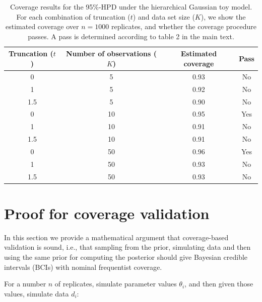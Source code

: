 \documentclass[oneside]{article}
\begin{document}
\begin{table}[!h]
\caption{Coverage results for the 95\%-HPD under the hierarchical Gaussian toy model.
For each combination of truncation ($t$) and data set size ($K$), we show the estimated coverage over $n=1000$ replicates, and whether the coverage procedure passes.
A pass is determined according to table 2 in the main text.
}
\centering
\begin{tabular}{cccc}
  \hline
  Truncation ($t$) & Number of observations ($K$) & Estimated coverage & Pass \\
  \hline
  \rowcolor{gray!10} 0   & 5                      & 0.93               & No     \\
  \rowcolor{gray!10} 1   & 5                      & 0.92               & No     \\
  \rowcolor{gray!10} 1.5 & 5                      & 0.90               & No     \\
                     0   & 10                     & 0.95               & Yes    \\
                     1   & 10                     & 0.91               & No     \\
                     1.5 & 10                     & 0.91               & No     \\
  \rowcolor{gray!10} 0   & 50                     & 0.96               & Yes    \\
  \rowcolor{gray!10} 1   & 50                     & 0.93               & No     \\
  \rowcolor{gray!10} 1.5 & 50                     & 0.93               & No     \\
  \hline
\end{tabular}
\end{table}

\newpage
\section{Proof for coverage validation}
 \label{appendix::sec:proofs}

In this section we provide a mathematical argument that coverage-based validation is sound, i.e., that sampling from the prior, simulating data and then using the same prior for computing the posterior should give Bayesian credible intervals (BCIs) with nominal frequentist coverage.

For a number $n$ of replicates, simulate parameter
  values $\theta_i$, and then given those values, simulate data $d_i$:
\end{document}
